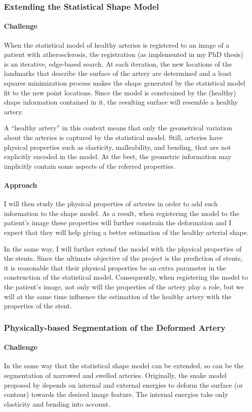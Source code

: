 \documentclass[a4paper]{article}
\newcommand{\challenge}{\paragraph{Challenge}}
\newcommand{\approach}{\paragraph{Approach}}
\begin{document}
\subsubsection{Extending the Statistical Shape Model}

\challenge
When the statistical model of healthy arteries is registered to an image of a patient with atherosclerosis, the registration (as implemented in my PhD thesis) is an iterative, edge-based search. At each iteration, the new locations of the landmarks that describe the surface of the artery are determined and a least squares minimization process makes the shape generated by the statistical model fit to the new point locations. Since the model is constrained by the (healthy) shape information contained in it, the resulting surface will resemble a healthy artery.

A ``healthy artery'' in this context means that only the geometrical variation about the arteries is captured by the statistical model. Still, arteries have physical properties such as elasticity, malleability, and bending, that are not explicitly encoded in the model. At the best, the geometric information may implicitly contain some aspects of the referred properties. 

\approach
I will then study the physical properties of arteries in order to add such information to the shape model. As a result, when registering the model to the patient's image these properties will further constrain the deformation and I expect that they will help giving a better estimation of the healthy arterial shape. 

In the same way, I will further extend the model with the physical properties of the stents. Since the ultimate objective of the project is the prediction of stents, it is reasonable that their physical properties be an extra parameter in the construction of the statistical model. Consequently, when registering the model to the patient's image, not only will the properties of the artery play a role, but we will at the same time influence the estimation of the healthy artery with the properties of the stent. 

\subsubsection{Physically-based Segmentation of the Deformed Artery}

\challenge
In the same way that the statistical shape model can be extended, so can be the segmentation of narrowed and swelled arteries. Originally, the snake model proposed by \citet{Kass} depends on internal and external energies to deform the surface (or contour) towards the desired image feature. The internal energies take only elasticity and bending into account. 
\end{document}
